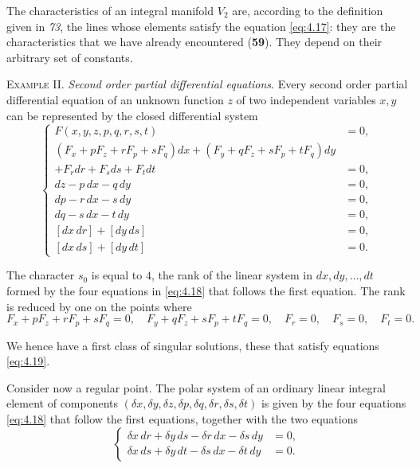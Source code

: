 The characteristics of an integral manifold $V_{2}$ are, according to the definition given in \textsection\emph{73}, the lines whose elements satisfy the equation \eqref{eq:4.17}: they are the characteristics that we have already encountered (\textsection\textbf{59}). They depend on their arbitrary set of constants.

\vspace{12pt}\fsec \textsc{Example II.} \emph{Second order partial differential equations}. Every second order partial differential equation of an unknown function $z$ of two independent variables $x,y$ can be represented by the closed differential system
\begin{equation}
  \label{eq:4.18}
  \left\{
    \begin{aligned}
      F(x,y,z,p,q,r,s,t)&=0,\\
      (F_{x}+pF_{z}+rF_{p}+sF_{q})dx+
      (F_{y}+qF_{z}+sF_{p}+tF_{q})dy\\
      +F_{r}dr+F_{s}ds+F_{t}dt&=0,\\
      dz-p\,dx-q\,dy&=0,\\
      dp-r\,dx-s\,dy&=0,\\
      dq-s\,dx-t\,dy&=0,\\
      [dx\,dr]+[dy\,ds]&=0,\\
      [dx\,ds]+[dy\,dt]&=0.
    \end{aligned}
  \right.
\end{equation}

The character $s_{0}$ is equal to $4$, the rank of the linear system in $dx,dy,\dots,dt$ formed by the four equations in \eqref{eq:4.18} that follows the first equation. The rank is reduced by one on the points where
\begin{equation}
  \label{eq:4.19}
  F_{x}+pF_{z}+rF_{p}+sF_{q}=0,\quad F_{y}+qF_{z}+sF_{p}+tF_{q}=0,\quad F_{r}=0,\quad F_{s}=0,\quad F_{t}=0.
\end{equation}

We hence have a first class of singular solutions, these that satisfy equations \eqref{eq:4.19}.

Consider now a regular point. The polar system of an ordinary linear integral element of components $(\delta x,\delta y, \delta z, \delta p, \delta q, \delta r, \delta s, \delta t)$ is given by the four equations \eqref{eq:4.18} that follow the first equations, together with the two equations
\begin{equation}
  \label{eq:4.20}
  \left\{
    \begin{aligned}
    \delta x\,dr+\delta y\,ds-\delta r\,dx-\delta s\,dy&=0,\\
    \delta x\,ds+\delta y\,dt-\delta s\,dx-\delta t\,dy&=0.      
    \end{aligned}
  \right.
\end{equation}

